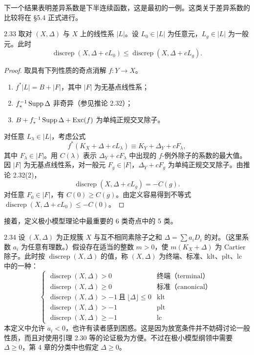 下一个结果表明差异系数是下半连续函数，这是最初的一例。这类关于差异系数的比较将在 §5.4 正式进行。

\begin{corollaryp}{2.33}
取对 $(X,\Delta)$ 与 $X$ 上的线性系 $|L|$。设 $L_0\in|L|$ 为任意元，$L_g\in|L|$ 为一般元。此时
\[
\operatorname{discrep}(X,\Delta+cL_0)\le\operatorname{discrep}(X,\Delta+cL_g).
\]
\end{corollaryp}
\begin{proof}
取具有下列性质的奇点消解 $f\colon Y\to X$。
\begin{enumerate}[label=（\arabic*）,leftmargin=2.6em,itemsep=1pt]
\item $f^*|L|=B+|F|$，其中 $|F|$ 为无基点线性系；
\item $f_*^{-1}\operatorname{Supp}\Delta$ 非奇异（参见推论 2.32）；
\item $B+f_*^{-1}\operatorname{Supp}\Delta+\operatorname{Exc}(f)$ 为单纯正规交叉除子。
\end{enumerate}
对任意 $L_\lambda\in|L|$，考虑公式
\[
f^*(K_X+\Delta+cL_\lambda)\equiv K_Y+\Delta_Y+cF_\lambda,
\]
其中 $F_\lambda\in|F|$。用 $C(\lambda)$ 表示 $\Delta_Y+cF_\lambda$ 中出现的 $f$-例外除子的系数的最大值。因 $|F|$ 为无基点线性系，对一般元 $F_g\in|F|$，$\Delta_Y+cF_g$ 为单纯正规交叉除子。由推论 2.32(2)，
\[
\operatorname{discrep}(X,\Delta+cL_g)=-C(g).
\]
对任意 $F_0\in|F|$，有 $C(0)\ge C(g)$。由定义容易得到不等式 $\operatorname{discrep}(X,\Delta+cL_0)\le-C(0)$。
\end{proof}

接着，定义极小模型理论中最重要的 6 类奇点中的 5 类。

\begin{definition}{2.34}
设 $(X,\Delta)$ 为正规簇 $X$ 与互不相同素除子之和 $\Delta=\sum a_iD_i$ 的对。（这里系数 $a_i$ 为任意有理数。）假设存在适当的整数 $m>0$，使 $m(K_X+\Delta)$ 为 Cartier 除子。此时按 $\operatorname{discrep}(X,\Delta)$ 的值，称 $(X,\Delta)$ 为终端、标准、klt、plt、lc 中的一种：
\[
\begin{cases}
\operatorname{discrep}(X,\Delta)>0 & \text{终端（terminal）}\\
\operatorname{discrep}(X,\Delta)\ge0 & \text{标准（canonical）}\\
\operatorname{discrep}(X,\Delta)>-1\ \text{且}\ \lfloor\Delta\rfloor\le0 & \text{klt}\\
\operatorname{discrep}(X,\Delta)>-1 & \text{plt}\\
\operatorname{discrep}(X,\Delta)\ge-1 & \text{lc}
\end{cases}
\]
本定义中允许 $a_i<0$，也许有读者感到困惑。这是因为放宽条件并不妨碍讨论一般性质，而且对使用引理 2.30 等的论证极为方便。不过在极小模型纲领中需要 $\Delta\ge0$，第 4 章的分类中也假定 $\Delta\ge0$。
\end{definition}

